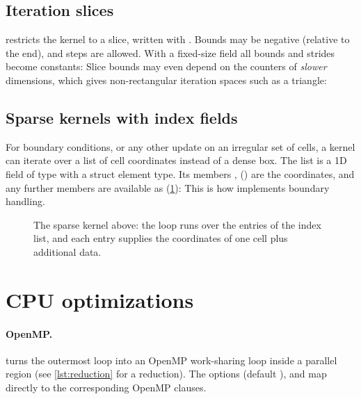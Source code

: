 \subsection{Iteration slices}
 restricts the kernel to a slice, written with
. Bounds may be negative (relative to the end), and steps are
allowed. With a fixed-size field all bounds and strides become constants:
Slice bounds may even depend on the counters of \emph{slower} dimensions, which gives
non-rectangular iteration spaces such as a triangle:

\subsection{Sparse kernels with index fields}\label{sec:sparse}
For boundary conditions, or any other update on an irregular set of cells, a kernel can
iterate over a list of cell coordinates instead of a dense box. The list is a 1D field of
type  with a struct element type. Its members , 
() are the coordinates, and any further members are available as
 (\cref{fig:sparse}):
This is how  implements boundary handling.

\begin{figure}[htbp]
  \centering
  
  \caption[A sparse index-list kernel]{The sparse kernel above: the loop runs over the entries of the index list, and each entry supplies the coordinates of one cell plus additional data.}
  \label{fig:sparse}
\end{figure}


\section{CPU optimizations}\label{sec:cpu-options}

\paragraph{OpenMP.}
 turns the outermost loop into an OpenMP work-sharing
loop inside a parallel region (see \cref{lst:reduction} for a reduction). The options
 (default ),  and  map
directly to the corresponding OpenMP clauses.


